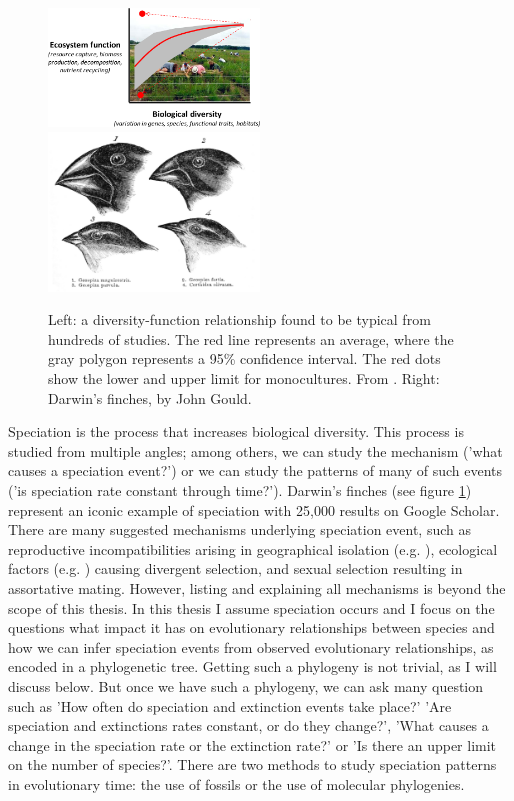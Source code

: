 \begin{figure}[H]
  \includegraphics[width=0.5\textwidth]{cardinale_et_al_fig_1.png}
  \includegraphics[width=0.5\textwidth]{Darwin's_finches_by_Gould.jpg}
  \caption{
    Left: a diversity-function relationship found to be typical from hundreds
    of studies. The red line represents an average, where the gray polygon
    represents a 95\% confidence interval. The red dots show the lower
    and upper limit for monocultures. From \cite{cardinale2012biodiversity}.
    Right: Darwin's finches, by John Gould.
  }
  \label{fig:cardinale_et_al_and_darwins_finches}
\end{figure}

Speciation is the process that increases biological diversity.
This process is studied from multiple angles; among others,
we can study the mechanism ('what
causes a speciation event?') or we can study the patterns of many
of such events ('is speciation rate constant through time?').
Darwin's finches (see figure \ref{fig:cardinale_et_al_and_darwins_finches}) 
represent an iconic example of speciation with 25,000 results on Google Scholar.
There are many suggested mechanisms underlying speciation event, such as reproductive incompatibilities arising in geographical isolation 
(e.g. \cite{mayr1942}), ecological factors (e.g. \cite{lack1947}) causing divergent selection, and sexual selection resulting in assortative mating. However, listing and explaining all mechanisms is beyond the scope of this thesis. In this thesis I assume speciation occurs and I focus on the questions what impact it has on evolutionary relationships between species and how we can infer speciation events from observed evolutionary relationships, as encoded in a phylogenetic tree. Getting such a phylogeny is not trivial, as I will discuss below. But once we have such a phylogeny, we can ask many question such 
as 'How often do speciation and extinction events take place?'
'Are speciation and extinctions rates constant, or do they change?',
'What causes a change in the speciation rate or the extinction rate?' or
'Is there an upper limit on the number of species?'. 
There are two methods to study speciation patterns in evolutionary time:
the use of fossils or the use of molecular phylogenies.

